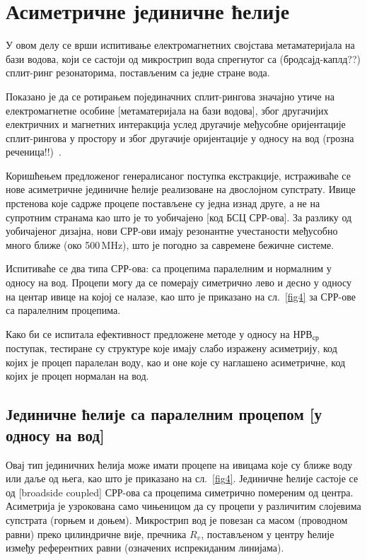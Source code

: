 \section{Асиметричне јединичне ћелије}\label{sekc3}

У овом делу се врши испитивање електромагнетних својстава метаматеријала на бази водова, који се састоји од микрострип вода спрегнутог са (бродсајд-каплд??) сплит-ринг резонаторима, постављеним са једне стране вода.

Показано је да се ротирањем појединачних сплит-рингова значајно утиче на електромагнетне особине [метаматеријала на бази водова], због другачијих електричних и магнетних интеракција услед другачије међусобне оријентације сплит-рингова у простору и због другачије оријентације у односу на вод (грозна реченица!!)~\cite{stereo,bib9}.

Коришћењем предложеног генералисаног поступка екстракције, истраживаће се нове асиметричне јединичне ћелије реализоване на двослојном супстрату. Ивице прстенова које садрже процепе постављене су једна изнад друге, а не на супротним странама као што је то уобичајено [код БСЦ СРР-ова]. За разлику од уобичајеног дизајна, нови СРР-ови имају резонантне учестаности међусобно много ближе (око 500\,MHz), што је погодно за савремене бежичне системе.

Испитиваће се два типа СРР-ова: са процепима паралелним и нормалним у односу на вод. Процепи могу да се померају симетрично лево и десно у односу на центар ивице на којој се налазе, као што је приказано на сл.~\ref{fig4} за СРР-ове са паралелним процепима.

Како би се испитала ефективност предложене методе у односу на $НРВ_{ср}$ поступак, тестиране су структуре које имају слабо изражену асиметрију, код којих је процеп паралелан воду, као и оне које су наглашено асиметричне, код којих је процеп нормалан на вод.

\subsection{Јединичне ћелије са паралелним процепом [у односу на вод]}

Овај тип јединичних ћелија може имати процепе на ивицама које су ближе воду или даље од њега, као што је приказано на сл.~\ref{fig4}. Јединичне ћелије састоје се од [broadside coupled] СРР-ова са процепима симетрично помереним од центра. Асиметрија је узрокована само чињеницом да су процепи у различитим слојевима супстрата (горњем и доњем). Микрострип вод је повезан са масом (проводном равни) преко цилиндричне вије, пречника $R_v$, постављеном у центру ћелије између референтних равни (означених испрекиданим линијама).

